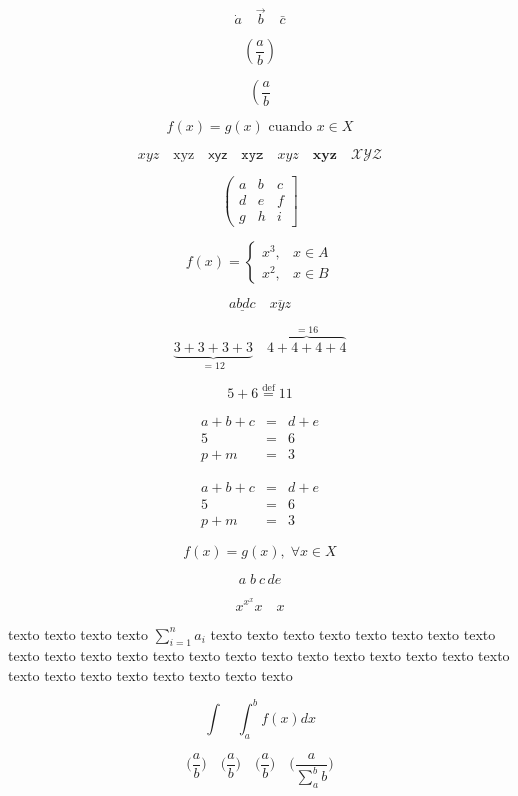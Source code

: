 \documentclass{report}
\begin{document}
$$
\dot{a}\quad\vec{b}\quad\bar{c}
$$

$$
\left(\frac{a}{b}\right)
$$

$$
\left(\frac{a}{b}\right.
$$

$$
f(x)=g(x) \mbox{ cuando } x\in X
$$

$$
xyz\quad \mathrm{xyz}\quad \mathsf{xyz}\quad \mathtt{xyz}\quad\mathit{xyz}\quad\mathbf{xyz} \quad\mathcal{XYZ}
$$

$$
\left(\begin{array}{ccc}
a & b & c \\
d & e & f \\
g & h & i
\end{array}\right]
$$

$$
f(x)=\left\{\begin{array}{ll}
x^3 , & x \in A \\
x^2, & x\in B
\end{array}\right.
$$

$$
\underline{abdc}\quad\overline{xyz}
$$

$$
\underbrace{3+3+3+3}_{=12}\quad \overbrace{4+4+4+4}^{=16}
$$

$$
5+6\stackrel{\mathrm{def}}{=}11
$$

\addtocounter{equation}{20}

\begin{eqnarray}
a+b+c&=&d+e \\
5&=&6 \\
p+m&=&3
\end{eqnarray}

\begin{eqnarray*}
a+b+c&=&d+e \\
5&=&6 \\
p+m&=&3
\end{eqnarray*}

$$
f(x)=g(x), \;\forall x\in X
$$

$$
a\;b\:c\,d\!e
$$

$$
x^{x^x} \scriptstyle{x}\quad\scriptscriptstyle{x}
$$

texto texto texto texto $\displaystyle\sum_{i=1}^n a_i$ texto texto texto texto texto texto texto texto texto texto texto texto texto texto texto texto texto texto texto texto texto texto texto texto texto texto texto texto texto texto

$$
\int\quad \textstyle{\int_a^b f(x)dx}
$$

$$
\big(\frac{a}{b}\big)\quad \Big(\frac{a}{b}\Big)\quad \bigg(\frac{a}{b}\bigg)\quad \Bigg(\frac{a}{\sum_a^b b}\Bigg)
$$
\end{document}
